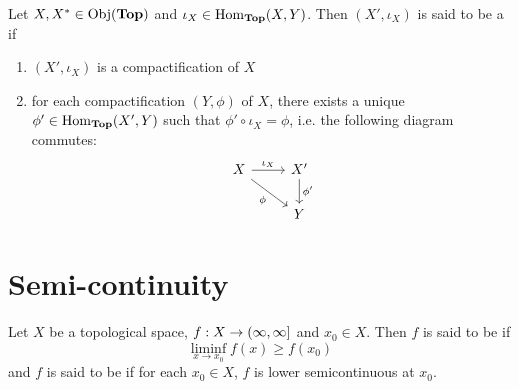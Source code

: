 \documentclass{book}
\begin{document}
	\begin{defn}
		Let $X, X^* \in \operatorname{Obj}(\operatorname*{\text{\textbf{Top}}})$ and $\iota_X \in \operatorname{Hom}_{\operatorname*{\text{\textbf{Top}}}}(X, Y)$. Then $(X', \iota_X)$ is said to be a  if 
		\begin{enumerate}
			\item $(X', \iota_X)$ is a compactification of $X$
			\item for each compactification $(Y, \phi)$ of $X$, there exists a unique $\phi' \in \operatorname{Hom}_{\operatorname*{\text{\textbf{Top}}}}(X', Y)$ such that $\phi' \circ \iota_X = \phi$, i.e. the following diagram commutes:
			\[ \begin{tikzcd}
				X \arrow[r, "\iota_X"] \arrow[dr, "\phi"'] & X' \arrow[d, "\phi'"]  \\
				                                           & Y
			\end{tikzcd}
			\]
		\end{enumerate}
	\end{defn}
	
	
	
	
	
	
	
	
	
	
	
	
	
	
	
	
	
	
	
	





	
	
	
	
	
	
	
	
	
	
	
	
	
	
	
	
	
	
	\newpage
	\section{Semi-continuity}
	
	\begin{defn} \ld{}
	Let $X$ be a topological space, $f: X \rightarrow (\infty, \infty]$ and $x_0 \in X$. Then $f$ is said to be  if $$\liminf_{x \rightarrow x_0}f(x) \geq f(x_0)$$ and $f$ is said to be  if for each $x_0 \in X$, $f$ is lower semicontinuous at $x_0$. 
	\end{defn}
	
\end{document}
